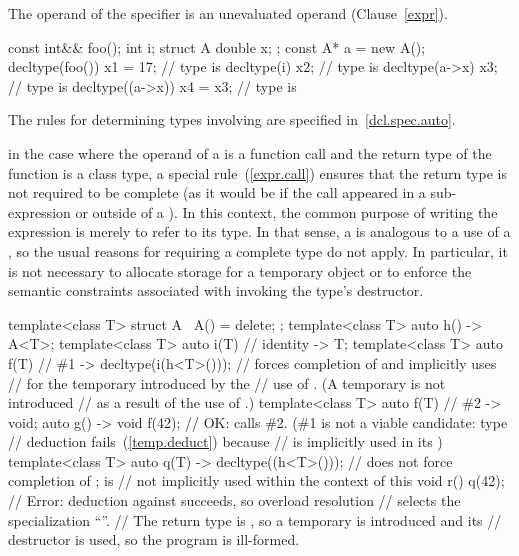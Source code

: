 The operand of the  specifier is an unevaluated
operand (Clause~\ref{expr}).

\enterexample
\begin{codeblock}
const int&& foo();
int i;
struct A { double x; };
const A* a = new A();
decltype(foo()) x1 = 17;        // type is 
decltype(i) x2;                 // type is 
decltype(a->x) x3;              // type is 
decltype((a->x)) x4 = x3;       // type is 
\end{codeblock}
\exitexample
\enternote
The rules for determining types involving  are specified
in~\ref{dcl.spec.auto}.
\exitnote

\pnum
\enternote in the case where the operand of a 
is a function call and the return type of the function is a class type, a
special rule~(\ref{expr.call}) ensures that the return type is not required to
be complete (as it would be if the call appeared in a sub-expression or outside
of a ). In this context, the common purpose of
writing the expression is merely to refer to its type. In that sense, a
 is analogous to a use of a ,
so the usual reasons for requiring a complete type do not apply. In particular,
it is not necessary to allocate storage for a temporary object or to enforce the
semantic constraints associated with invoking the type's destructor. \enterexample
\begin{codeblock}
template<class T> struct A { ~A() = delete; };
template<class T> auto h()
  -> A<T>;
template<class T> auto i(T)     // identity
  -> T;
template<class T> auto f(T)     // \#1
  -> decltype(i(h<T>()));       // forces completion of  and implicitly uses
                                //  for the temporary introduced by the
                                // use of . (A temporary is not introduced
                                // as a result of the use of .)
template<class T> auto f(T)     // \#2
  -> void;
auto g() -> void {
  f(42);                        // OK: calls \#2. (\#1 is not a viable candidate: type
                                // deduction fails~(\ref{temp.deduct}) because 
                                // is implicitly used in its )
}
template<class T> auto q(T)
  -> decltype((h<T>()));        // does not force completion of ;  is
                                // not implicitly used within the context of this 
void r() {
  q(42);                        // Error: deduction against  succeeds, so overload resolution
                                // selects the specialization ``''.
                                // The return type is , so a temporary is introduced and its
                                // destructor is used, so the program is ill-formed.
}
\end{codeblock}
\exitexample\exitnote

